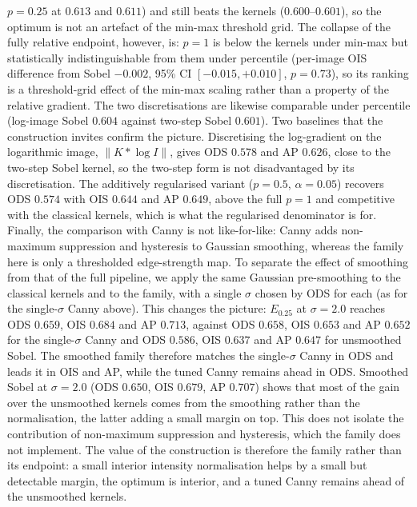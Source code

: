 \documentclass[conference]{IEEEtran}
\begin{document}
$p=0.25$ at $0.613$ and $0.611$) and still beats the kernels
($0.600$--$0.601$), so the optimum is not an artefact of the min-max threshold
grid.  The collapse of the fully relative endpoint, however, is: $p=1$ is below the
kernels under min-max but statistically indistinguishable from them under percentile
(per-image OIS difference from Sobel $-0.002$, 95\% CI $[-0.015,+0.010]$,
$p=0.73$), so its ranking is a threshold-grid effect of the min-max scaling rather
than a property of the relative gradient.  The two discretisations are likewise comparable under
percentile (log-image Sobel $0.604$ against two-step Sobel $0.601$).
Two baselines that the construction invites confirm the picture.  Discretising the
log-gradient on the logarithmic image, $\|K*\log I\|$, gives ODS $0.578$ and AP
$0.626$, close to the two-step Sobel kernel, so the two-step form is not
disadvantaged by its discretisation.  The additively regularised variant
($p=0.5$, $\alpha=0.05$) recovers ODS $0.574$ with OIS $0.644$ and AP $0.649$,
above the full $p=1$ and competitive with the classical kernels, which is what the
regularised denominator is for.  Finally, the comparison with Canny is not
like-for-like: Canny adds non-maximum suppression and hysteresis to Gaussian
smoothing, whereas the family here is only a thresholded edge-strength map.  To
separate the effect of smoothing from that of the full pipeline, we apply the same
Gaussian pre-smoothing to the classical kernels and to the family, with a single
$\sigma$ chosen by ODS for each (as for the single-$\sigma$ Canny above).  This
changes the picture: $E_{0.25}$ at $\sigma=2.0$ reaches ODS $0.659$, OIS $0.684$
and AP $0.713$, against ODS $0.658$, OIS $0.653$ and AP $0.652$ for the
single-$\sigma$ Canny and ODS $0.586$, OIS $0.637$ and AP $0.647$ for unsmoothed
Sobel.  The smoothed family therefore matches the single-$\sigma$ Canny in ODS and
leads it in OIS and AP, while the tuned Canny remains ahead in ODS.  Smoothed
Sobel at $\sigma=2.0$ (ODS $0.650$, OIS $0.679$, AP $0.707$) shows that most of
the gain over the unsmoothed kernels comes from the smoothing rather than the
normalisation, the latter adding a small margin on top.  This does not isolate the
contribution of non-maximum suppression and hysteresis, which the family does not
implement.  The value of the construction is therefore the family rather than its
endpoint: a small interior intensity normalisation helps by a small but detectable
margin, the optimum is interior, and a tuned Canny remains ahead of the unsmoothed
kernels.
\end{document}
